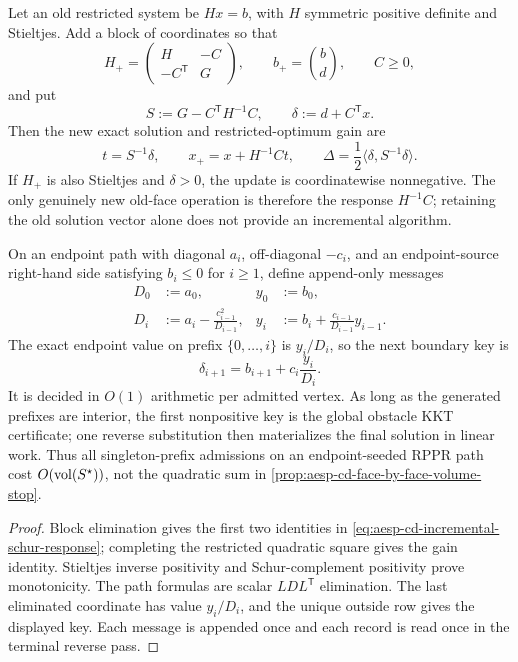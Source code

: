 \begin{proposition}
\label{prop:aesp-cd-incremental-schur-response}
Let an old restricted system be $Hx=b$, with $H$ symmetric positive definite
and Stieltjes.  Add a block of coordinates so that
\begin{equation*}
 H_+=\begin{pmatrix}H&-C\\-C^{\mathsf T}&G\end{pmatrix},
 \qquad b_+=\binom b d,
 \qquad C\geq0,
\end{equation*}
and put
\begin{equation*}
 S:=G-C^{\mathsf T}H^{-1}C,
 \qquad \delta:=d+C^{\mathsf T}x.
\end{equation*}
Then the new exact solution and restricted-optimum gain are
\begin{equation}
 t=S^{-1}\delta,\qquad
 x_+=x+H^{-1}Ct,\qquad
 \Delta=\frac12\langle\delta,S^{-1}\delta\rangle.
 \label{eq:aesp-cd-incremental-schur-response}
\end{equation}
If $H_+$ is also Stieltjes and $\delta>0$, the update is coordinatewise
nonnegative.  The only genuinely new old-face operation is therefore the
response $H^{-1}C$; retaining the old solution vector alone does not provide
an incremental algorithm.

On an endpoint path with diagonal $a_i$, off-diagonal $-c_i$, and an
endpoint-source right-hand side satisfying $b_i\leq0$ for $i\geq1$, define
append-only messages
\begin{align*}
 D_0&:=a_0,& y_0&:=b_0,\\
 D_i&:=a_i-\frac{c_{i-1}^2}{D_{i-1}},&
 y_i&:=b_i+\frac{c_{i-1}}{D_{i-1}}y_{i-1}.
\end{align*}
The exact endpoint value on prefix $\{0,\ldots,i\}$ is $y_i/D_i$, so the
next boundary key is
\begin{equation*}
 \delta_{i+1}=b_{i+1}+c_i\frac{y_i}{D_i}.
\end{equation*}
It is decided in $O(1)$ arithmetic per admitted vertex.  As long as the
generated prefixes are interior, the first nonpositive key is the global
obstacle KKT certificate; one reverse substitution then materializes the
final solution in linear work.  Thus all singleton-prefix admissions on an
endpoint-seeded RPPR path cost $O(\operatorname{vol}(S^\star))$, not the quadratic sum in
\cref{prop:aesp-cd-face-by-face-volume-stop}.
\end{proposition}

\begin{proof}
Block elimination gives the first two identities in
\cref{eq:aesp-cd-incremental-schur-response}; completing the restricted
quadratic square gives the gain identity.  Stieltjes inverse positivity and
Schur-complement positivity prove monotonicity.  The path formulas are scalar
$LDL^{\mathsf T}$ elimination.  The last eliminated coordinate has value
$y_i/D_i$, and the unique outside row gives the displayed key.  Each message
is appended once and each record is read once in the terminal reverse pass.
\end{proof}

